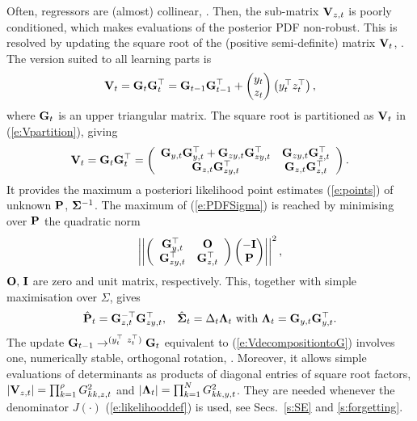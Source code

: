 Often, regressors are (almost) collinear, \cite{Linetal:22}. Then, the sub-matrix $\mathbf{V}_{z,t}$ is poorly conditioned, which makes evaluations of the posterior PDF non-robust. This is resolved by updating the square root of the (positive semi-definite) matrix $\mathbf{V}_{t}$, \cite{GolLoa:12}. The version suited to all learning parts is
\begin{equation}
    \label{e:VdecompositiontoG}
    \mathbf{V}_{t} = \mathbf{G}_{t}\mathbf{G}_{t}^{\top}=\mathbf{G}_{t-1}\mathbf{G}_{t-1}^{\top}+
    \begin{pmatrix}
        y_{t}\\ z_{t}
    \end{pmatrix}
    \begin{pmatrix}
        y_{t}^{\top} z_{t}^{\top}
    \end{pmatrix},
\end{equation}
where $\mathbf{G}_{t}$ is an upper triangular matrix. The square root is partitioned as $\mathbf{V}_{t}$ in (\ref{e:Vpartition}), giving
\begin{equation*}
\mathbf{V}_{t}=\mathbf{G}_{t}\mathbf{G}_{t}^{\top} =
\left(\begin{array}{cc}
    \mathbf{G}_{y,t}\mathbf{G}_{y,t}^{\top} + \mathbf{G}_{zy,t}\mathbf{G}_{zy,t}^{\top}  & \mathbf{G}_{zy,t}\mathbf{G}_{z,t}^{\top} \\ \mathbf{G}_{z,t}\mathbf{G}_{zy,t}^{\top} &  \mathbf{G}_{z,t}\mathbf{G}_{z,t}^{\top}
     \end{array}\right).
\end{equation*}
It provides the maximum a posteriori likelihood point estimates (\ref{e:points}) of unknown $\mathbf{P}$, $\mathbf{\Sigma}^{-1}$. The maximum of (\ref{e:PDFSigma}) is reached by minimising over $\mathbf{P}$ the quadratic norm
\begin{equation*}
\left|\left|\left(\begin{array}{cc}
    \mathbf{G}_{y,t}^{\top} & \mathbf{O}\\ \mathbf{G}_{zy, t}^{\top} & \mathbf{G}_{z,t}^{\top}
\end{array}\right)
\begin{pmatrix}
    -\mathbf{I} \\ \mathbf{P}
\end{pmatrix}\right|\right|^2,
\end{equation*}
$\mathbf{O},\,\mathbf{I}$ are zero and unit matrix, respectively.
This, together with simple maximisation over $\Sigma$, gives
\begin{equation}
\label{e:leastsquaresPwithG}
 \hat{\mathbf{P}}_{t} = \mathbf{G}_{z,t}^{-\top}\mathbf{G}_{zy,t}^{\top},\hspace*{2ex}
   \hat{\mathbf{\Sigma}}_{t}=\Delta_{t}\mathbf{\Lambda}_{t} \mbox{ with }   \mathbf{\Lambda}_{t} = \mathbf{G}_{y,t}\mathbf{G}_{y,t}^{\top}.
\end{equation}
The update $\mat{G}_{t-1}\rightarrow^{(y_{t}^{\top}\ z_{t}^{\top})} \mat{G}_{t}$ equivalent to (\ref{e:VdecompositiontoG}) involves one, numerically stable, orthogonal rotation, \cite{Bir:77}. Moreover, it allows simple evaluations of determinants as products of diagonal entries of square root factors, $|\mathbf{V}_{z,t}|=\prod_{k=1}^{\rho}G_{kk,z,t}^{2}$ and $|\mathbf{\Lambda}_{t}|=\prod_{k=1}^{N}G^{2}_{kk,y,t}$. They are needed whenever the denominator $J(\cdot)$ (\ref{e:likelihooddef}) is used, see Secs.\ \ref{s:SE} and \ref{s:forgetting}. 